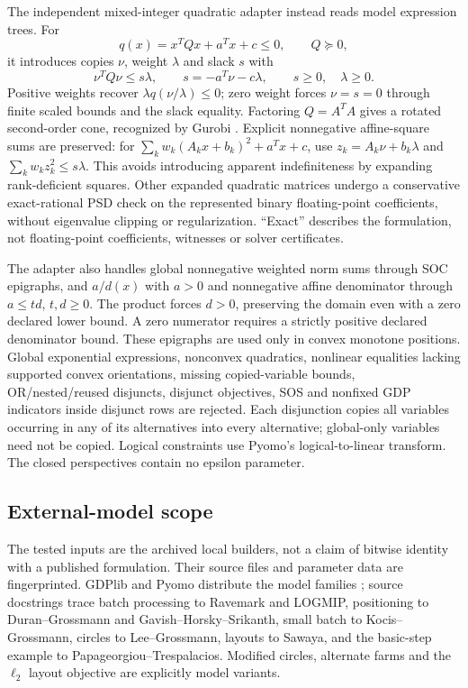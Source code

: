The independent mixed-integer quadratic adapter instead reads model expression trees. For
\[
 q(x)=x^TQx+a^Tx+c\le0,\qquad Q\succeq0,
\]
it introduces copies $\nu$, weight $\lambda$ and slack $s$ with
\begin{equation}\label{eq:quadratic-cone}
 \nu^TQ\nu\le s\lambda,\qquad
 s=-a^T\nu-c\lambda,\qquad s\ge0,\quad\lambda\ge0.
\end{equation}
Positive weights recover $\lambda q(\nu/\lambda)\le0$; zero weight forces $\nu=s=0$ through finite scaled bounds and the slack equality. Factoring $Q=A^TA$ gives a rotated second-order cone, recognized by Gurobi \citep{gurobi}. Explicit nonnegative affine-square sums are preserved: for $\sum_kw_k(A_kx+b_k)^2+a^Tx+c$, use $z_k=A_k\nu+b_k\lambda$ and $\sum_kw_kz_k^2\le s\lambda$. This avoids introducing apparent indefiniteness by expanding rank-deficient squares. Other expanded quadratic matrices undergo a conservative exact-rational PSD check on the represented binary floating-point coefficients, without eigenvalue clipping or regularization. ``Exact'' describes the formulation, not floating-point coefficients, witnesses or solver certificates.

The adapter also handles global nonnegative weighted norm sums through SOC epigraphs, and $a/d(x)$ with $a>0$ and nonnegative affine denominator through $a\le td$, $t,d\ge0$. The product forces $d>0$, preserving the domain even with a zero declared lower bound. A zero numerator requires a strictly positive declared denominator bound. These epigraphs are used only in convex monotone positions. Global exponential expressions, nonconvex quadratics, nonlinear equalities lacking supported convex orientations, missing copied-variable bounds, OR/nested/reused disjuncts, disjunct objectives, SOS and nonfixed GDP indicators inside disjunct rows are rejected. Each disjunction copies all variables occurring in any of its alternatives into every alternative; global-only variables need not be copied. Logical constraints use Pyomo's logical-to-linear transform. The closed perspectives contain no epsilon parameter.

\subsection{External-model scope}\label{app:legacy-scope}
The tested inputs are the archived local builders, not a claim of bitwise identity with a published formulation. Their source files and parameter data are fingerprinted. GDPlib and Pyomo distribute the model families \citep{gdplib,pyomoexamples}; source docstrings trace batch processing to Ravemark and LOGMIP, positioning to Duran--Grossmann and Gavish--Horsky--Srikanth, small batch to Kocis--Grossmann, circles to Lee--Grossmann, layouts to Sawaya, and the basic-step example to Papageorgiou--Trespalacios. Modified circles, alternate farms and the $\ell_2$ layout objective are explicitly model variants.

